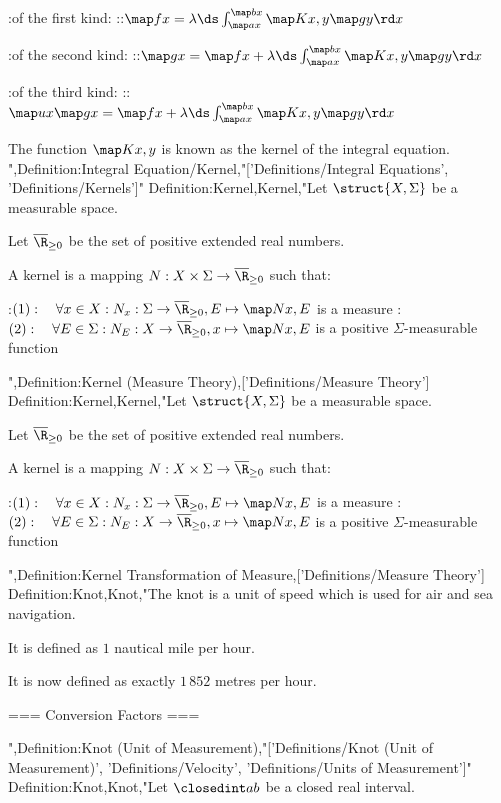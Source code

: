 :of the first kind:
::$\map f x = \lambda \ds \int_{\map a x}^{\map b x} \map K {x, y} \map g y \rd x$

:of the second kind:
::$\map g x = \map f x + \lambda \ds \int_{\map a x}^{\map b x} \map K {x, y} \map g y \rd x$

:of the third kind:
::$\map u x \map g x = \map f x + \lambda \ds \int_{\map a x}^{\map b x} \map K {x, y} \map g y \rd x$


The function $\map K {x, y}$ is known as the kernel of the integral equation.
",Definition:Integral Equation/Kernel,"['Definitions/Integral Equations', 'Definitions/Kernels']"
Definition:Kernel,Kernel,"Let $\struct {X, \Sigma}$ be a measurable space.

Let $\overline \R_{\ge 0}$ be the set of positive extended real numbers.


A kernel is a mapping $N: X \times \Sigma \to \overline{\R}_{\ge0}$ such that:

:$(1): \quad \forall x \in X: N_x: \Sigma \to \overline \R_{\ge 0}, E \mapsto \map N {x, E}$ is a measure
:$(2): \quad \forall E \in \Sigma: N_E: X \to \overline \R_{\ge 0}, x \mapsto \map N {x, E}$ is a positive $\Sigma$-measurable function

",Definition:Kernel (Measure Theory),['Definitions/Measure Theory']
Definition:Kernel,Kernel,"Let $\struct {X, \Sigma}$ be a measurable space.

Let $\overline \R_{\ge 0}$ be the set of positive extended real numbers.


A kernel is a mapping $N: X \times \Sigma \to \overline{\R}_{\ge0}$ such that:

:$(1): \quad \forall x \in X: N_x: \Sigma \to \overline \R_{\ge 0}, E \mapsto \map N {x, E}$ is a measure
:$(2): \quad \forall E \in \Sigma: N_E: X \to \overline \R_{\ge 0}, x \mapsto \map N {x, E}$ is a positive $\Sigma$-measurable function


",Definition:Kernel Transformation of Measure,['Definitions/Measure Theory']
Definition:Knot,Knot,"The knot is a unit of speed which is used for air and sea navigation.

It is defined as $1$ nautical mile per hour.

It is now defined as exactly $1 \, 852$ metres per hour.


=== Conversion Factors ===

",Definition:Knot (Unit of Measurement),"['Definitions/Knot (Unit of Measurement)', 'Definitions/Velocity', 'Definitions/Units of Measurement']"
Definition:Knot,Knot,"Let $\closedint a b$ be a closed real interval.

